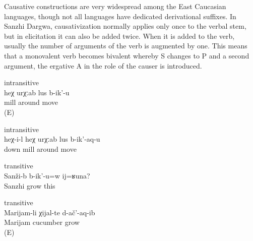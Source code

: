 Causative constructions are very widespread among the East Caucasian languages, though not all languages have dedicated derivational suffixes. In Sanzhi Dargwa, causativization normally applies only once to the verbal stem, but in elicitation it can also be added twice. When it is added to the verb, usually the number of arguments of the verb is augmented by one. This means that a monovalent verb becomes bivalent whereby S changes to P and a second argument, the ergative A in the role of the causer is introduced. 
%
\begin{exe}
	\ex	\label{ex:This mill spins around} intransitive \\
	\gll	heχ	urχːab	lus	b-ik'-u\\
			mill	around	move\\
	\glt	{} (E)


	\ex	\label{ex:This makes the mill spin around} intransitive \\
	\gll	heχ-i-l	heχ	urχːab	lus	b-ik'-aq-u\\
			down	mill	around	move\\
	\glt	{}

	\ex	\label{ex:‎‎Something like this grows in Sanzhi} transitive \\
	\gll	Sanži-b	b-ik'-u=w	ij=ʁuna?\\
		Sanzhi	grow	this\\
	\glt	{}
	
	\ex	\label{ex:‎Marijam was growing cucumbers} transitive \\
	\gll	Marijam-li	χijal-te	d-ač'-aq-ib\\
		Marijam	cucumber	grow\\
	\glt	{} (E)
\end{exe}


